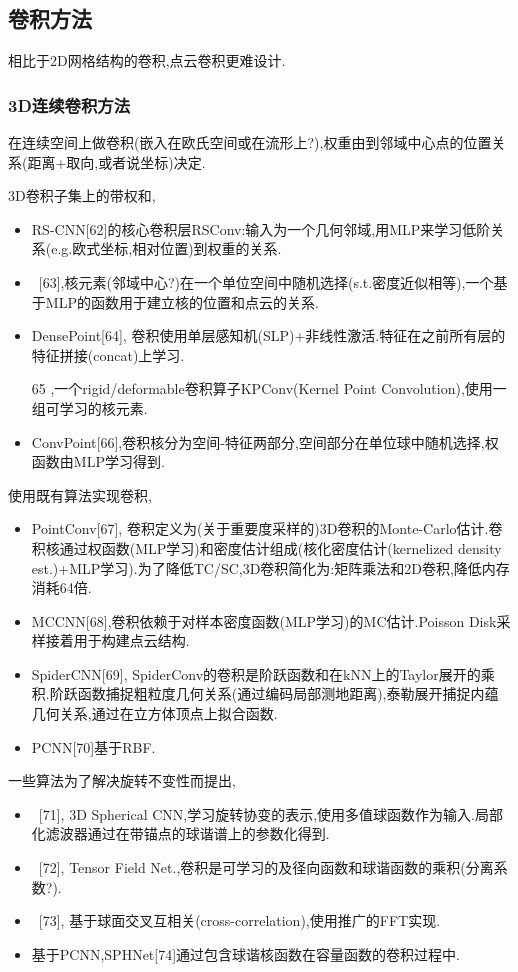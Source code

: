 \documentclass{article}
\begin{document}
\subsection{卷积方法}
相比于2D网格结构的卷积,点云卷积更难设计.
\subsubsection{3D连续卷积方法}
在连续空间上做卷积(嵌入在欧氏空间或在流形上?),权重由到邻域中心点的位置关系(距离+取向,或者说坐标)决定.

3D卷积\tRarr 子集上的带权和,
\begin{itemize}
    \item RS-CNN[62]的核心卷积层RSConv:输入为一个几何邻域,用MLP来学习低阶关系(e.g.欧式坐标,相对位置)到权重的关系.
    \item \ [63],核元素(邻域中心?)在一个单位空间中随机选择(s.t.密度近似相等),一个基于MLP的函数用于建立核的位置和点云的关系.
    \item DensePoint[64], 卷积使用单层感知机(SLP)+非线性激活.特征在之前所有层的特征拼接(concat)上学习.
    \item [65],一个rigid/deformable卷积算子KPConv(Kernel Point Convolution),使用一组可学习的核元素.
    \item ConvPoint[66],卷积核分为空间-特征两部分,空间部分在单位球中随机选择,权函数由MLP学习得到.
\end{itemize}

使用既有算法实现卷积,
\begin{itemize}
    \item PointConv[67], 卷积定义为(关于重要度采样的)3D卷积的Monte-Carlo估计.卷积核通过权函数(MLP学习)和密度估计组成(核化密度估计(kernelized density est.)+MLP学习).为了降低TC/SC,3D卷积简化为:矩阵乘法和2D卷积,降低内存消耗64倍.
    \item MCCNN[68],卷积依赖于对样本密度函数(MLP学习)的MC估计.Poisson Disk采样接着用于构建点云结构.
    \item SpiderCNN[69], SpiderConv的卷积是阶跃函数和在kNN上的Taylor展开的乘积.阶跃函数捕捉粗粒度几何关系(通过编码局部测地距离),泰勒展开捕捉内蕴几何关系,通过在立方体顶点上拟合函数.
    \item PCNN[70]基于RBF.
\end{itemize}

一些算法为了解决旋转不变性而提出,
\begin{itemize}
    \item \ [71], 3D Spherical CNN,学习旋转协变的表示,使用多值球函数作为输入.局部化滤波器通过在带锚点的球谐谱上的参数化得到.
    \item \ [72], Tensor Field Net.,卷积是可学习的及径向函数和球谐函数的乘积(分离系数?).
    \item \ [73], 基于球面交叉互相关(cross-correlation),使用推广的FFT实现.
    \item 基于PCNN,SPHNet[74]通过包含球谐核函数在容量函数的卷积过程中.
\end{itemize}
\end{document}
